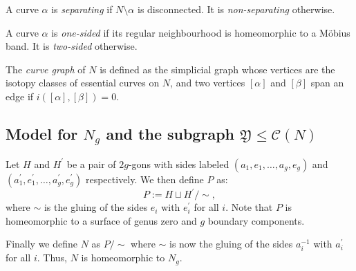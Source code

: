 \documentclass{artv3}
\newcommand*{\cg}[1]{\mathcal{C}(#1)}
\newcommand*{\Y}{\mathfrak{Y}}
\begin{document}
A curve $\alpha$ is \textit{separating} if $N \setminus \alpha$ is disconnected. It is \textit{non-separating} otherwise.

A curve $\alpha$ is \textit{one-sided} if its regular neighbourhood is homeomorphic to a Möbius band. It is \emph{two-sided} otherwise.

The \textit{curve graph} of $N$ is defined as the simplicial graph whose vertices are the isotopy classes of essential curves on $N$, and two vertices $[\alpha]$ and $[\beta]$ span an edge if $i([\alpha],[\beta]) = 0$.

\subsection{Model for $N_{g}$ and the subgraph $\Y \leq \cg{N}$}\label{subsec:model}

Let $H$ and $H^{\prime}$ be a pair of $2g$-gons with sides labeled $(a_{1}, e_{1}, \ldots, a_{g}, e_{g})$ and $(a^{\prime}_{1}, e^{\prime}_{1}, \ldots, a^{\prime}_{g}, e^{\prime}_{g})$ respectively. We then define $P$ as: $$P := H \sqcup H^{\prime}/ \sim,$$ where $\sim$ is the gluing of the sides $e_{i}$ with $e^{\prime}_{i}$ for all $i$. Note that $P$ is homeomorphic to a surface of genus zero and $g$ boundary components.

Finally we define $N$ as $P / \sim$ where $\sim$ is now the gluing of the sides $a_{i}^{-1}$ with $a^{\prime}_{i}$ for all $i$. Thus, $N$ is homeomorphic to $N_{g}$.
\end{document}
